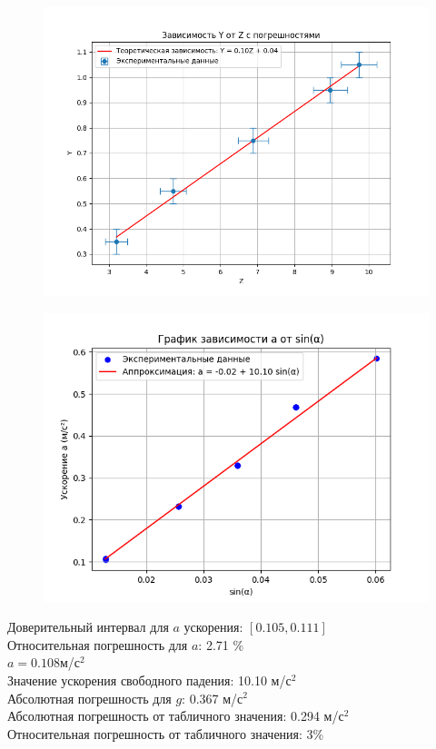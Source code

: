 \documentclass[a4paper]{article}
\begin{document}
\begin{figure}[H]
\begin{center}
\includegraphics[scale=0.5]{Graph_1.png}
\end{center}
\end{figure}
\begin{center}

\begin{figure}[H]
\begin{center}
\includegraphics[scale=0.5]{Figure_2_m.png}\\
\end{center}
\end{figure}

Доверительный интервал для $a$ ускорения: $[0.105, 0.111]$ \\
Относительная погрешность для $a$: 2.71 \%\\
$a = 0.108$м/с$^2$\\
Значение ускорения свободного падения: 10.10 м/с$^2$\\
Абсолютная погрешность для $g$: 0.367 м/с$^2$\\
Абсолютная погрешность от табличного значения: 0.294 м/с$^2$\\
Относительная погрешность от табличного значения: 3\% \\

\end{center}
\end{document}
